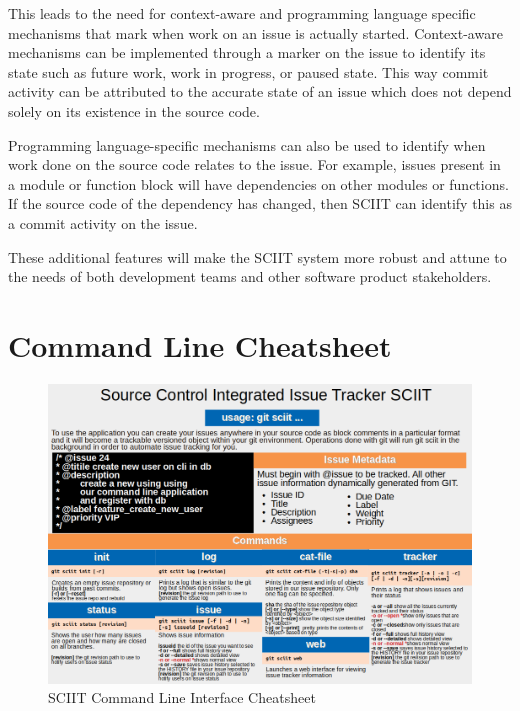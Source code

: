\documentclass{mproj}
\begin{document}
This leads to the need for context-aware and programming language specific mechanisms that mark when work on an issue is actually started. Context-aware mechanisms can be implemented through a marker on the issue to identify its state such as future work, work in progress, or paused state. This way commit activity can be attributed to the accurate state of an issue which does not depend solely on its existence in the source code.

Programming language-specific mechanisms can also be used to identify when work done on the source code relates to the issue. For example, issues present in a module or function block will have dependencies on other modules or functions. If the source code of the dependency has changed, then SCIIT can identify this as a commit activity on the issue.

These additional features will make the SCIIT system more robust and attune to the needs of both development teams and other software product stakeholders.


\appendix %
\chapter{Command Line Cheatsheet}
\begin{figure}[h!]
\caption{SCIIT Command Line Interface Cheatsheet}
\label{fig:sciit-cheatsheet}
\centering
\includegraphics[width=16cm]{Cheatsheet}
\end{figure}




\end{document}

